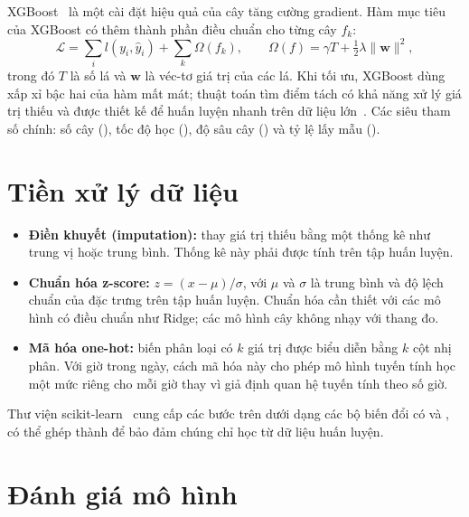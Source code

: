 \documentclass[../main.tex]{subfiles}
\begin{document}
XGBoost~\cite{chen2016xgboost} là một cài đặt hiệu quả của cây tăng cường gradient. Hàm mục tiêu của XGBoost có thêm thành phần điều chuẩn cho từng cây $f_k$:
\begin{equation}
\mathcal{L} = \sum_{i} l(y_i, \hat{y}_i) + \sum_{k} \Omega(f_k), \qquad \Omega(f) = \gamma T + \tfrac{1}{2}\lambda \lVert \mathbf{w} \rVert^2,
\end{equation}
trong đó $T$ là số lá và $\mathbf{w}$ là véc-tơ giá trị của các lá. Khi tối ưu, XGBoost dùng xấp xỉ bậc hai của hàm mất mát; thuật toán tìm điểm tách có khả năng xử lý giá trị thiếu và được thiết kế để huấn luyện nhanh trên dữ liệu lớn~\cite{chen2016xgboost}. Các siêu tham số chính: số cây (), tốc độ học (), độ sâu cây () và tỷ lệ lấy mẫu ().

\section{Tiền xử lý dữ liệu}
\begin{itemize}
    \item \textbf{Điền khuyết (imputation):} thay giá trị thiếu bằng một thống kê như trung vị hoặc trung bình. Thống kê này phải được tính trên tập huấn luyện.
    \item \textbf{Chuẩn hóa z-score:} $z = (x - \mu)/\sigma$, với $\mu$ và $\sigma$ là trung bình và độ lệch chuẩn của đặc trưng trên tập huấn luyện. Chuẩn hóa cần thiết với các mô hình có điều chuẩn như Ridge; các mô hình cây không nhạy với thang đo.
    \item \textbf{Mã hóa one-hot:} biến phân loại có $k$ giá trị được biểu diễn bằng $k$ cột nhị phân. Với giờ trong ngày, cách mã hóa này cho phép mô hình tuyến tính học một mức riêng cho mỗi giờ thay vì giả định quan hệ tuyến tính theo số giờ.
\end{itemize}
Thư viện scikit-learn~\cite{pedregosa2011scikit} cung cấp các bước trên dưới dạng các bộ biến đổi có  và , có thể ghép thành  để bảo đảm chúng chỉ học từ dữ liệu huấn luyện.

\section{Đánh giá mô hình}
\end{document}
